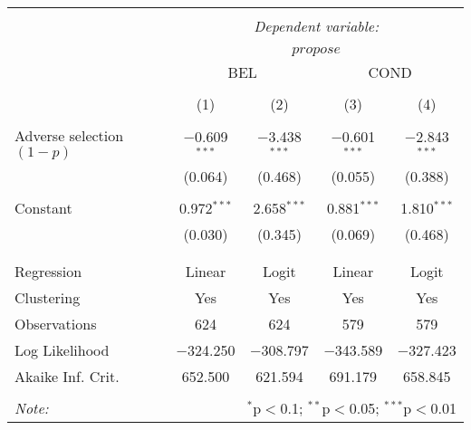 
\begin{tabular}{@{\extracolsep{5pt}}lcccc} 
\\[-1.8ex]\hline 
\hline \\[-1.8ex] 
 & \multicolumn{4}{c}{\textit{Dependent variable:}} \\ 
\cline{2-5} 
\\[-1.8ex] & \multicolumn{4}{c}{$propose$} \\ 
 & \multicolumn{2}{c}{BEL} & \multicolumn{2}{c}{COND} \\ 
\\[-1.8ex] & (1) & (2) & (3) & (4)\\ 
\hline \\[-1.8ex] 
 Adverse selection $(1-p)$ & $-$0.609$^{***}$ & $-$3.438$^{***}$ & $-$0.601$^{***}$ & $-$2.843$^{***}$ \\ 
  & (0.064) & (0.468) & (0.055) & (0.388) \\ 
  & & & & \\ 
 Constant & 0.972$^{***}$ & 2.658$^{***}$ & 0.881$^{***}$ & 1.810$^{***}$ \\ 
  & (0.030) & (0.345) & (0.069) & (0.468) \\ 
  & & & & \\ 
\hline \\[-1.8ex] 
Regression & Linear & Logit & Linear & Logit \\ 
Clustering & Yes & Yes & Yes & Yes \\ 
Observations & 624 & 624 & 579 & 579 \\ 
Log Likelihood & $-$324.250 & $-$308.797 & $-$343.589 & $-$327.423 \\ 
Akaike Inf. Crit. & 652.500 & 621.594 & 691.179 & 658.845 \\ 
\hline 
\hline \\[-1.8ex] 
\textit{Note:}  & \multicolumn{4}{r}{$^{*}$p$<$0.1; $^{**}$p$<$0.05; $^{***}$p$<$0.01} \\ 
\end{tabular} 
